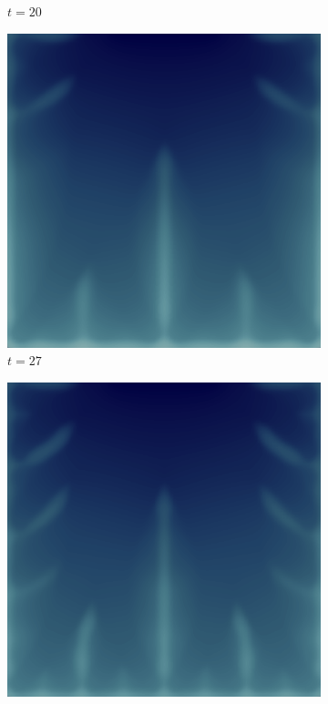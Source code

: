 \begin{figure}[H]
\begin{subfigure}{.4\textwidth}
        \caption{$t = 20$}
    \end{subfigure}
    \begin{subfigure}{.4\textwidth}
        \includegraphics[width=\textwidth]{imgs/UnitSquare1_State/fifth.png}
        \caption{$t = 27$}
    \end{subfigure}
    \begin{subfigure}{.4\textwidth}
        \includegraphics[width=\textwidth]{imgs/UnitSquare1_State/sixth.png}

\end{subfigure}
\end{figure}

